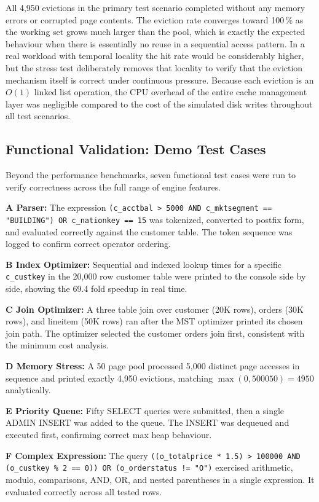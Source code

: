\documentclass[conference]{IEEEtran}
\newcommand{\code}[1]{\texttt{#1}}
\begin{document}
All 4,950 evictions in the primary test scenario completed without any memory
errors or corrupted page contents. The eviction rate converges toward 100\,\% as
the working set grows much larger than the pool, which is exactly the expected
behaviour when there is essentially no reuse in a sequential access pattern. In a
real workload with temporal locality the hit rate would be considerably higher, but
the stress test deliberately removes that locality to verify that the eviction
mechanism itself is correct under continuous pressure. Because each eviction is an
$O(1)$ linked list operation, the CPU overhead of the entire cache management
layer was negligible compared to the cost of the simulated disk writes throughout
all test scenarios.

\subsection{Functional Validation: Demo Test Cases}

Beyond the performance benchmarks, seven functional test cases were run to verify
correctness across the full range of engine features.

\textbf{A  Parser:} The expression \code{(c\_acctbal > 5000 AND c\_mktsegment
== "BUILDING") OR c\_nationkey == 15} was tokenized, converted to postfix form,
and evaluated correctly against the customer table. The token sequence was logged
to confirm correct operator ordering.

\textbf{B  Index Optimizer:} Sequential and indexed lookup times for a
specific \code{c\_custkey} in the 20,000 row customer table were printed to the
console side by side, showing the 69.4 fold speedup in real time.

\textbf{C  Join Optimizer:} A three table join over customer (20K rows),
orders (30K rows), and lineitem (50K rows) ran after the MST optimizer printed
its chosen join path. The optimizer selected the customer orders join first,
consistent with the minimum cost analysis.

\textbf{D  Memory Stress:} A 50 page pool processed 5,000 distinct page
accesses in sequence and printed exactly 4,950 evictions, matching $\max(0,
5000   50) = 4950$ analytically.

\textbf{E  Priority Queue:} Fifty SELECT queries were submitted, then a single
ADMIN INSERT was added to the queue. The INSERT was dequeued and executed first,
confirming correct max heap behaviour.

\textbf{F  Complex Expression:} The query \code{((o\_totalprice * 1.5) >
100000 AND (o\_custkey \% 2 == 0)) OR (o\_orderstatus != "O")} exercised
arithmetic, modulo, comparisons, AND, OR, and nested parentheses in a single
expression. It evaluated correctly across all tested rows.
\end{document}
